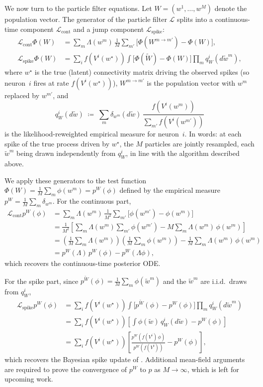 \documentclass[11pt,a4paper]{article}
\theoremstyle{definition}
\begin{document}
We now turn to the particle filter equations. Let $W = (w^1, \ldots, w^M)$
denote the population vector. The generator of the particle filter
$\mathcal{L}$ splits into a continuous-time component
$\mathcal{L}_\text{cont}$ and a jump component
$\mathcal{L}_\text{spike}$:
\begin{align*}
    \mathcal{L}_\text{cont} \Phi(W) &= \sum_m \Lambda(w^m)\, \frac{1}{M} \sum_{m'} \bigl[\Phi(W^{m \to m'}) - \Phi(W)\bigr], \\
    \mathcal{L}_\text{spike} \Phi(W) &= \sum_i f(V^i(w^\star)) \int \bigl[\Phi(\tilde W) - \Phi(W)\bigr] \prod_m q^i_W(d \tilde w^m),
\end{align*}
where $w^\star$ is the true (latent) connectivity matrix driving the
observed spikes (so neuron~$i$ fires at rate $f(V^i(w^\star))$),
$W^{m \to m'}$ is the population vector with $w^m$ replaced by $w^{m'}$,
and
\[
  q^i_W(d \tilde w) \;\coloneqq\; \sum_m \delta_{w^m}(d \tilde w)\,
        \frac{f(V^i(w^m))}{\sum_{m'} f(V^i(w^{m'}))}
\]
is the likelihood-reweighted empirical measure for neuron~$i$.
In words: at each spike of the true process driven by $w^\star$, the
$M$ particles are jointly resampled, each $\tilde w^m$ being drawn
independently from $q^i_W$, in line with the algorithm described above.

We apply these generators to the test function
$\Phi(W) = \tfrac{1}{M}\sum_m \phi(w^m) = p^W(\phi)$ defined by the
empirical measure $p^W = \tfrac{1}{M}\sum_m \delta_{w^m}$. For the
continuous part,
\begin{align*}
    \mathcal{L}_\text{cont} p^W(\phi) &= \sum_m \Lambda(w^m)\, \frac{1}{M^2} \sum_{m'} \bigl[\phi(w^{m'}) - \phi(w^m)\bigr] \\
    &= \frac{1}{M^2} \left[ \sum_m \Lambda(w^m) \sum_{m'} \phi(w^{m'}) - M \sum_m \Lambda(w^m)\, \phi(w^m) \right] \\
    &= \left( \frac{1}{M} \sum_m \Lambda(w^m) \right) \left( \frac{1}{M} \sum_m \phi(w^m) \right) - \frac{1}{M} \sum_m \Lambda(w^m)\, \phi(w^m) \\
    &= p^W(\Lambda)\, p^W(\phi) - p^W(\Lambda \phi),
\end{align*}
which recovers the continuous-time posterior ODE.

For the spike part, since $p^{\tilde W}(\phi) = \tfrac{1}{M}\sum_m \phi(\tilde w^m)$ and the $\tilde w^m$ are i.i.d.\ draws from $q^i_W$,
\begin{align*}
    \mathcal{L}_\text{spike} p^W(\phi) &= \sum_i f(V^i(w^\star)) \int \bigl[ p^{\tilde W}(\phi) - p^W(\phi) \bigr] \prod_m q^i_W(d \tilde w^m) \\
    &= \sum_i f(V^i(w^\star)) \left[ \int \phi(\tilde w)\, q^i_W(d \tilde w) - p^W(\phi) \right] \\
    &= \sum_i f(V^i(w^\star)) \left[ \frac{p^W(f(V^i)\, \phi)}{p^W(f(V^i))} - p^W(\phi) \right],
\end{align*}
which recovers the Bayesian spike update of .
Additional mean-field arguments are required to prove the convergence
of $p^W$ to $p$ as $M \to \infty$, which is left
for upcoming work.
\end{document}
